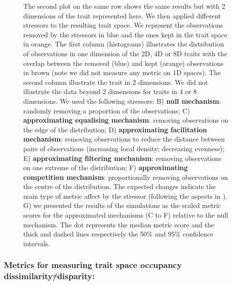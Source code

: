\documentclass[12pt,letterpaper]{article}
\providecommand{\DIFaddtex}[1]{{\protect\color{blue}\uwave{#1}}} %
\providecommand{\DIFdeltex}[1]{{\protect\color{red}\sout{#1}}}                      %
\providecommand{\DIFaddbegin}{} %
\providecommand{\DIFaddend}{} %
\providecommand{\DIFdelbegin}{} %
\providecommand{\DIFdelend}{} %
\providecommand{\DIFaddendFL}{} %
\providecommand{\DIFadd}[1]{\texorpdfstring{\DIFaddtex{#1}}{#1}} %
\providecommand{\DIFdel}[1]{\texorpdfstring{\DIFdeltex{#1}}{}} %
\newcommand{\DIFscaledelfig}{0.5}
\newlength{\DIFdelgraphicswidth} %
\newlength{\DIFdelgraphicsheight} %
\newcommand{\DIFaddincludegraphics}[2][]{{\color{blue}\fbox{\DIFOincludegraphics[#1]{#2}}}} %
\newcommand{\DIFdelincludegraphics}[2][]{%
\sbox{\DIFdelgraphicsbox}{\DIFOincludegraphics[#1]{#2}}%
\settoboxwidth{\DIFdelgraphicswidth}{\DIFdelgraphicsbox} %
\settoboxtotalheight{\DIFdelgraphicsheight}{\DIFdelgraphicsbox} %
\scalebox{\DIFscaledelfig}{%
\parbox[b]{\DIFdelgraphicswidth}{\usebox{\DIFdelgraphicsbox}\\[-\baselineskip] \rule{\DIFdelgraphicswidth}{0em}}\llap{\resizebox{\DIFdelgraphicswidth}{\DIFdelgraphicsheight}{%
\setlength{\unitlength}{\DIFdelgraphicswidth}%
\begin{picture}(1,1)%
\thicklines\linethickness{2pt} %
{\color[rgb]{1,0,0}\put(0,0){\framebox(1,1){}}}%
{\color[rgb]{1,0,0}\put(0,0){\line( 1,1){1}}}%
{\color[rgb]{1,0,0}\put(0,1){\line(1,-1){1}}}%
\end{picture}%
}\hspace*{3pt}}} %
} %
\DeclareRobustCommand{\DIFaddbegin}{\DIFOaddbegin \let\includegraphics\DIFaddincludegraphics} %
\DeclareRobustCommand{\DIFaddend}{\DIFOaddend \let\includegraphics\DIFOincludegraphics} %
\DeclareRobustCommand{\DIFdelbegin}{\DIFOdelbegin \let\includegraphics\DIFdelincludegraphics} %
\DeclareRobustCommand{\DIFdelend}{\DIFOaddend \let\includegraphics\DIFOincludegraphics} %
\DeclareRobustCommand{\DIFaddendFL}{\DIFOaddendFL \let\includegraphics\DIFOincludegraphics} %
\begin{document}
\begin{figure}[!htbp]
{{The second plot on the same row shows the same results but with 2 dimensions of the trait represented here.
We then applied different stressors to the resulting trait space.
We represent the observations removed by the stressors in blue and the ones kept in the trait space in orange.
The first column (histograms) illustrates the distribution of observations in one dimension of the 2D, 4D or 8D traits with the overlap between the removed (blue) and kept (orange) observations in brown (note we did not measure any metric on 1D spaces).
The second column illustrate the trait in 2 dimensions.
We did not illustrate the data beyond 2 dimensions for traits in 4 or 8 dimensions.
We used the following stressors:
B) \textbf{null mechanism}: randomly removing a proportion of the observations;
C) \textbf{approximating equalising mechanism}: removing observations on the edge of the distribution;
D) \textbf{approximating facilitation mechanism}: removing observations to reduce the distance between pairs of observations (increasing local density; decreasing evenness);
E) \textbf{approximating filtering mechanism}: removing observations on one extreme of the distribution;
F) \textbf{approximating competition mechanism}: proportionally removing observations on the centre of the distribution.
The expected changes indicate the main type of metric affect by the stressor (following the aspects in \citealt{mammola2021concepts}).
G) we presented the results of the simulations as the scaled metric scores for the approximated mechanisms (C to F) relative to the null mechanism. The dot represents the median metric score and the thick and dashed lines respectively the 50\% and 95\% confidence intervals.}\DIFaddendFL }
\label{Fig:simulations}
\end{figure}
\bigskip

\subsubsection{Metrics for measuring trait space occupancy \DIFaddbegin \DIFadd{(}\textit{\DIFadd{aka}} \DIFadd{function diversity, }\DIFaddend dissimilarity\DIFdelbegin \DIFdel{/}\DIFdelend \DIFaddbegin \DIFadd{, }\DIFaddend disparity\DIFaddbegin \DIFadd{)}\DIFaddend :}
\end{document}
